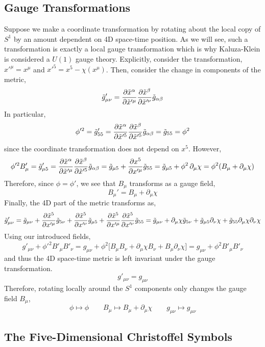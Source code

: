 \documentclass[11pt, a4paper]{article}
\begin{document}
\subsection{Gauge Transformations}

Suppose we make a coordinate transformation by rotating about the local copy of $S^1$ by an amount dependent on 4D space-time position. As we will see, such a transformation is exactly a local gauge transformation which is why Kaluza-Klein is considered a $U(1)$ gauge theory. Explicitly, consider the transformation, $x'^\mu = x^\mu$ and $x'^5 = x^5 - \chi(x^\mu)$. Then, consider the change in components of the metric,
\[ \tilde{g}'_{\mu \nu} = \frac{\partial{\tilde{x}^\alpha}}{\partial{\tilde{x}'^\mu}} \frac{\partial{\tilde{x}^\beta}}{\partial{\tilde{x}'^\nu}} \tilde{g}_{\alpha \beta} \]
In particular,
\[ \phi'^2 = \tilde{g}'_{55} = \frac{\partial{\tilde{x}^\alpha}}{\partial{\tilde{x}'^5}} \frac{\partial{\tilde{x}^\beta}}{\partial{\tilde{x}'^5}} \tilde{g}_{\alpha \beta} = \tilde{g}_{55} = \phi^2 \]
since the coordinate transformation does not depend on $x^5$. However,
\[ \phi'^2 B'_\mu = \tilde{g}'_{\mu 5} = \frac{\partial{\tilde{x}^\alpha}}{\partial{\tilde{x}'^\mu}} \frac{\partial{\tilde{x}^\beta}}{\partial{\tilde{x}'^5}} \tilde{g}_{\alpha \beta} = \tilde{g}_{\mu 5} + \frac{\partial{x^5}}{\partial{x'^\mu}} \tilde{g}_{55} = \tilde{g}_{\mu 5} + \phi^2 \, \partial_\mu \chi = \phi^2 ( B_\mu + \partial_\mu \chi)\]
Therefore, since $\phi = \phi'$, we see that $B_\mu$ transforms as a gauge field,
\[ B_\mu' = B_\mu + \partial_\mu \chi \] 
Finally, the 4D part of the metric transforms as,
\[ \tilde{g}'_{\mu \nu} = \tilde{g}_{\mu \nu} + \frac{\partial{\tilde{x}^5}}{\partial{x'^\mu}}  \tilde{g}_{5 \nu} + \frac{\partial{\tilde{x}^5}}{\partial{x'^\nu}}  \tilde{g}_{\mu 5} + \frac{\partial{\tilde{x}^5}}{\partial{x'^\mu}} \frac{\partial{\tilde{x}^5}}{\partial{x'^\nu}}  \tilde{g}_{5 5} = \tilde{g}_{\mu \nu} + \partial_\mu \chi \tilde{g}_{5 \nu} + \tilde{g}_{\mu 5} \partial_\nu \chi + \tilde{g}_{55} \partial_\mu \chi \partial_\nu \chi  \]
Using our introduced fields,
\[ g'_{\mu \nu} + \phi'^2 B'_\mu B'_\nu = g_{\mu \nu} + \phi^2 \bigg[ B_\mu B_\nu + \partial_\mu \chi B_\nu + B_\mu \partial_\nu \chi \bigg] = g_{\mu \nu} + \phi^2 B'_\mu B'_\nu \]
and thus the 4D space-time metric is left invariant under the gauge transformation. 
\[ g'_{\mu \nu} = g_{\mu \nu} \]
Therefore, rotating locally around the $S^1$ components only changes the gauge field $B_\mu$,
\[ \phi \mapsto \phi \quad \quad B_\mu \mapsto B_\mu + \partial_\mu \chi \quad \quad g_{\mu \nu} \mapsto g_{\mu \nu} \]


\subsection{The Five-Dimensional Christoffel Symbols}
\end{document}
